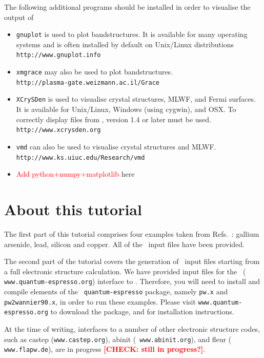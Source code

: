 \documentclass[a4paper,11pt,twoside]{article}
\def\tent#1{\textcolor{red}{#1}}     %
\begin{document}
The following additional programs should be installed in order to
visualise the output of \wannier\ 
\begin{itemize}
\item {\tt gnuplot} is used to plot bandstructures. It is 
available for many operating systems and is often installed by default on
 Unix/Linux distributions\\
{\tt http://www.gnuplot.info}
\item {\tt xmgrace} may also be used to plot bandstructures.\\
{\tt http://plasma-gate.weizmann.ac.il/Grace}
\item {\tt XCrySDen} is used to visualise crystal structures, MLWF,
  and Fermi surfaces. It is available for Unix/Linux, 
  Windows (using cygwin), and OSX. To correctly display 
files from \wannier, version 1.4 or later must be used.\\
{\tt http://www.xcrysden.org}
\item {\tt vmd} can also be used to visualise crystal structures and
  MLWF.\\
{\tt http://www.ks.uiuc.edu/Research/vmd}
\item{\tent{Add python+numpy+matplotlib} here}
\end{itemize}



\section*{About this tutorial}

The first part of this tutorial comprises four examples taken from
Refs.~\cite{MV,SMV}: gallium arsenide, lead, silicon and copper. All
of the \wannier\ input files have been provided.

The second part of the tutorial covers the generation of \wannier\
input files starting from a full electronic structure calculation. We
have provided input files for the \pwscf\ ({\tt
  www.quantum-espresso.org}) interface to \wannier. Therefore, you
will need to install and compile elements of the {\tt
  quantum-espresso} package, namely {\tt pw.x} and {\tt
  pw2wannier90.x}, in order to run these
examples. Please visit {\tt www.quantum-espresso.org} to download the
package, and for installation instructions. 

At the time of
writing, interfaces to a number of other electronic structure codes,
such as {\sc 
  castep} ({\tt www.castep.org}), {\sc abinit} ({\tt
  www.abinit.org}), and {\sc fleur} ({\tt
  www.flapw.de}), are in progress \tent{{\bf [CHECK: still in progress?]}}.
\end{document}
